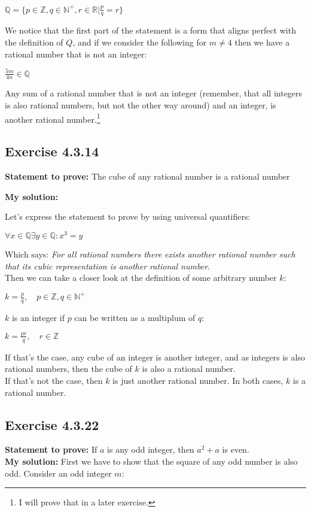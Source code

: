 \documentclass{article}
\newcommand{\cent}[1]{\begin{center}#1\end{center}}
\newcommand{\doubleR}{\mathbb{R}}
\newcommand{\doubleZ}{\mathbb{Z}}
\newcommand{\doubleN}{\mathbb{N}}
\newcommand{\doubleQ}{\mathbb{Q}}
\newcommand{\In}{\! \in \!}
\newcommand{\Prove}{\textbf{Statement to prove: }}
\newcommand{\Solution}{\textbf{My solution: }}
\newcommand{\QED}{\boxed{}}
\newcommand{\Exercise}[1]{\subsection{Exercise #1}}
\begin{document}
	\cent{$\doubleQ = \{p \in \doubleZ, q \in \doubleN^+, r \in \doubleR | \frac{p}{q} = r\}$}
	
	We notice that the first part of the statement is a form that aligns perfect with the definition of $Q$, and if we consider the following for $m \neq 4$ then we have a rational number that is not an integer:
	
	\cent{$\frac{5m}{4n} \in \doubleQ$} 
	
	Any sum of a rational number that is not an integer (remember, that all integers is also rational numbers, but not the other way around) and an integer, is another rational number.\footnote{I will prove that in a later exercise.}\\
	\QED
	
	\Exercise{4.3.14}
	
	\Prove
	The cube of any rational number is a rational number
	
	\Solution
	
	Let's express the statement to prove by using universal quantifiers:
	
	\cent{$\forall x \In \doubleQ \exists y \In \doubleQ : x^3 = y$}
	
	Which says: \textit{For all rational numbers there exists another rational number such that its cubic representation is another rational number}.\\
	
	Then we can take a closer look at the definition of some arbitrary number $k$:
	
	\cent{$k = \frac{p}{q}, \quad p \In \doubleZ, q \In \doubleN^+$}
	
	$k$ is an integer if $p$ can be written as a multiplum of $q$:
	
	\cent{$k = \frac{pr}{q}, \quad r \In \doubleZ$}
	
	If that's the case, any cube of an integer is another integer, and as integers is also rational numbers, then the cube of $k$ is also a rational number.\\
	
	If that's not the case, then $k$ is just another rational number. In both cases, $k$ is a rational number.\\
	\QED
	
	\Exercise{4.3.22}
	
	\Prove
	If $a$ is any odd integer, then $a^2 + a$ is even.\\
	
	\Solution
	First we have to show that the square of any odd number is also odd. Consider an odd integer $m$:
	
\end{document}
